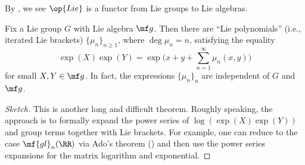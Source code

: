 \documentclass{article}
\begin{document}
\begin{remark}
	By , we see $\op{Lie}$ is a functor from Lie groups to Lie algebras.
\end{remark}
\begin{theorem}
	Fix a Lie group $G$ with Lie algebra $\mf g$. Then there are ``Lie polynomials'' (i.e., iterated Lie brackets) $\{\mu_n\}_{n\ge1}$, where $\deg\mu_n=n$, satisfying the equality
	\[\exp(X)\exp(Y)=\exp\Bigg(x+y+\sum_{n=1}^\infty\mu_n(x,y)\Bigg)\]
	for small $X,Y\in\mf g$. In fact, the expressions $\{\mu_n\}_n$ are independent of $G$ and $\mf g$.
\end{theorem}
\begin{proof}[Sketch]
	This is another long and difficult theorem. Roughly speaking, the approach is to formally expand the power series of $\log(\exp(X)\exp(Y))$ and group terms together with Lie brackets. For example, one can reduce to the case $\mf{gl}_n(\RR)$ via Ado's theorem () and then use the power series expansions for the matrix logarithm and exponential.
\end{proof}
\end{document}
